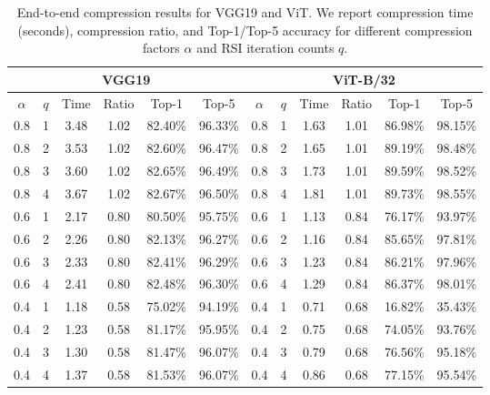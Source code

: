 \documentclass[twoside,leqno,onecolumn]{article}
\begin{document}
\begin{table}[t]
\centering
\caption{End-to-end compression results for VGG19 and ViT. We report compression time (seconds), compression ratio, and Top-1/Top-5 accuracy for different compression factors \(\alpha\) and RSI iteration counts \(q\).}
\label{tab:compression_results}
\begin{tabular}{cccccc|cccccc}
\toprule
\multicolumn{6}{c|}{\textbf{VGG19}} & \multicolumn{6}{c}{\textbf{ViT-B/32}} \\
\midrule
\(\alpha\) & \(q\) & Time & Ratio & Top-1 & Top-5 &
\(\alpha\) & \(q\) & Time & Ratio & Top-1 & Top-5 \\
\midrule

0.8 & 1 & 3.48  & 1.02  & 82.40\% & 96.33\% & 0.8 & 1 & 1.63 & 1.01 & 86.98\% & 98.15\% \\
0.8 & 2 & 3.53 & 1.02 & 82.60\% & 96.47\% & 0.8 & 2 & 1.65 & 1.01 & 89.19\% & 98.48\% \\
0.8 & 3 & 3.60 & 1.02 & 82.65\% & 96.49\% & 0.8 & 3 & 1.73 & 1.01 & 89.59\% & 98.52\% \\
0.8 & 4 & 3.67 & 1.02 & 82.67\% & 96.50\% & 0.8 & 4 & 1.81 & 1.01 & 89.73\% & 98.55\% \\
\cmidrule(lr){1-6} \cmidrule(lr){7-12}

0.6 & 1 & 2.17 & 0.80 & 80.50\% & 95.75\% & 0.6 & 1 & 1.13 & 0.84 & 76.17\% & 93.97\% \\
0.6 & 2 & 2.26  & 0.80 & 82.13\% &  96.27\% & 0.6 & 2 & 1.16 & 0.84 & 85.65\% & 97.81\% \\
0.6 & 3 & 2.33 & 0.80 & 82.41\% & 96.29\% & 0.6 & 3 & 1.23 & 0.84 & 86.21\% & 97.96\% \\
0.6 & 4 & 2.41 & 0.80 & 82.48\% & 96.30\% & 0.6 & 4 & 1.29 & 0.84 & 86.37\% & 98.01\% \\
\cmidrule(lr){1-6} \cmidrule(lr){7-12}

0.4 & 1 & 1.18 & 0.58 & 75.02\% & 94.19\% & 0.4 & 1 & 0.71 & 0.68 & 16.82\% &  35.43\%\\
0.4 & 2 & 1.23 & 0.58 & 81.17\% & 95.95\% & 0.4 & 2 & 0.75 & 0.68 & 74.05\% & 93.76\% \\
0.4 & 3 & 1.30  & 0.58 & 81.47\% & 96.07\% & 0.4 & 3 & 0.79 & 0.68 & 76.56\% & 95.18\% \\
0.4 & 4 & 1.37 & 0.58 & 81.53\% & 96.07\% & \cellcolor{gray!15} 0.4 & \cellcolor{gray!15} 4 & \cellcolor{gray!15} 0.86 & \cellcolor{gray!15} 0.68 & \cellcolor{gray!15} 77.15\% & \cellcolor{gray!15} 95.54\% \\
\cmidrule(lr){1-6} \cmidrule(lr){7-12}


\end{tabular}
\end{table}
\end{document}
